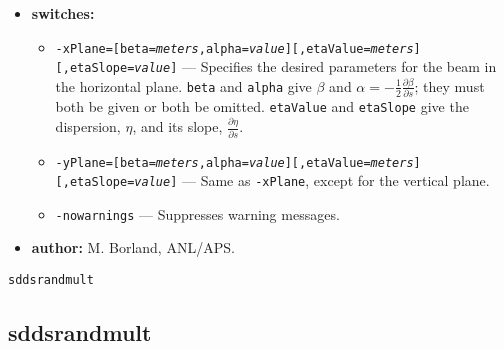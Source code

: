 \documentclass[11pt]{article}
\begin{document}
\begin{itemize}
\item {\bf switches:}
\begin{itemize}
\item {\tt -xPlane=[beta={\em meters},alpha={\em value}][,etaValue={\em meters}][,etaSlope={\em value}]} ---
        Specifies the desired parameters for the beam in the horizontal plane.  {\tt beta} and {\tt alpha} give
        $\beta$ and $\alpha = -\frac{1}{2}\frac{\partial \beta}{\partial s}$; they must both be given
        or both be omitted.  {\tt etaValue} and {\tt etaSlope} give the dispersion, $\eta$, and 
        its slope, $\frac{\partial \eta}{\partial s}$.
\item {\tt -yPlane=[beta={\em meters},alpha={\em value}][,etaValue={\em meters}][,etaSlope={\em value}]} ---
        Same as {\tt -xPlane}, except for the vertical plane.
\item {\tt -nowarnings} --- Suppresses warning messages.
\end{itemize}

\item {\bf author:} M. Borland, ANL/APS.
\end{itemize}

\begin{latexonly}
\newpage
\begin{center}{\Large\verb|sddsrandmult|}\end{center}
\end{latexonly}
\subsection{sddsrandmult}
\label{sddsrandmult}
\end{document}
